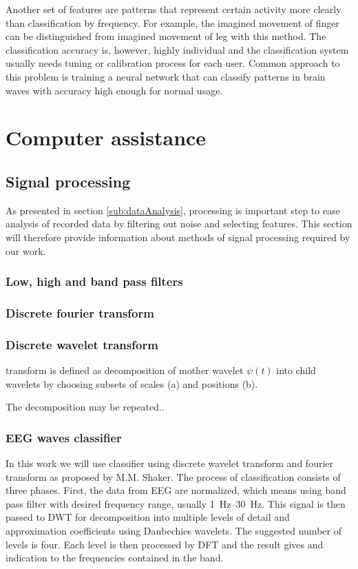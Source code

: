 Another set of features are patterns that represent certain activity more
clearly than classification by frequency. For example, the imagined movement of
finger can be distinguished from imagined movement of leg with this method. The
classification accuracy is, however, highly individual and the classification
system usually needs tuning or calibration process for each user.\cite{bcComm}
Common approach to this problem is training a neural network that can classify
patterns in brain waves with accuracy high enough for normal usage.

\chapter{Computer assistance}
\section{Signal processing}
\label{sec:sigProc}
As presented in section \ref{sub:dataAnalysis}, processing is important
step to ease analysis of recorded data by filtering out noise and selecting
features. This section will therefore provide information about methods of
signal processing required by our work.
\subsection{Low, high and band pass filters}

\subsection{Discrete fourier transform}

\subsection{Discrete wavelet transform}
transform is defined as decomposition of mother wavelet $\psi(t)$ into child
wavelets by choosing subsets of scales (a) and positions (b). 

The decomposition may be repeated..
\subsection{EEG waves classifier}
In this work we will use classifier using discrete wavelet transform and fourier
transform as proposed by M.M. Shaker. \cite{eegWaveFt} The process of
classification consists of three phases. First, the data from EEG are
normalized, which means using band pass filter with desired frequency range,
usually \SIrange{1}{30}{\Hz}. This signal is then passed to DWT for
decomposition into multiple levels of detail and approximation
coefficients using Daubechies wavelets. The suggested number of levels is four.
Each level is then processed by DFT and the result gives and indication to the
frequencies contained in the band.

